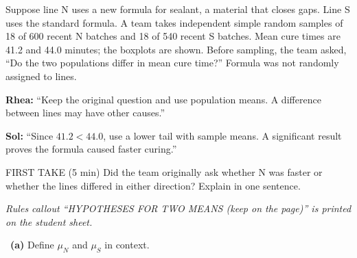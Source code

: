\documentclass[11pt]{article}
\begin{document}
Suppose line N uses a new formula for sealant, a material that closes gaps. Line S uses the standard formula. A team takes independent simple random samples of 18 of 600 recent N batches and 18 of 540 recent S batches. Mean cure times are 41.2 and 44.0 minutes; the boxplots are shown. Before sampling, the team asked, ``Do the two populations differ in mean cure time?'' Formula was not randomly assigned to lines.\par\smallskip \textbf{Rhea:} ``Keep the original question and use population means. A difference between lines may have other causes.''\par \textbf{Sol:} ``Since $41.2<44.0$, use a lower tail with sample means. A significant result proves the formula caused faster curing.''\par
\begin{center}
\end{center}
\begin{firsttakebox}{FIRST TAKE (5 min)}
Did the team originally ask whether N was faster or whether the lines differed in either direction? Explain in one sentence.\par
{}
\end{firsttakebox}

\textit{Rules callout ``HYPOTHESES FOR TWO MEANS (keep on the page)'' is printed on the student sheet.}\par\medskip

~\textbf{(a)} Define $\mu_N$ and $\mu_S$ in context.\par
{}
\end{document}

